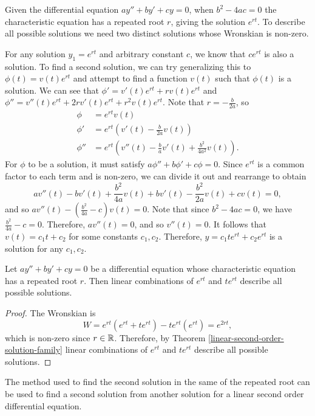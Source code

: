 Given the differential equation $ay'' + by' + cy = 0$, when $b^2 - 4ac = 0$ the characteristic equation has a repeated root $r$, giving the solution $e^{rt}$. To describe all possible solutions we need two distinct solutions whose Wronskian is non-zero.

For any solution $y_1 = e^{rt}$ and arbitrary constant $c$, we know that $ce^{rt}$ is also a solution. To find a second solution, we can try generalizing this to $\phi(t) = v(t)e^{rt}$ and attempt to find a function $v(t)$ such that $\phi(t)$ is a solution. We can see that $\phi' = v'(t)e^{rt} + rv(t)e^{rt}$ and $\phi'' = v''(t)e^{rt} + 2rv'(t)e^{rt} + r^2v(t)e^{rt}$. Note that $r = -\frac{b}{2a}$, so
\begin{align*}
    \phi &= e^{rt}v(t) \\
    \phi' &= e^{rt}(v'(t) - \frac{b}{2a}v(t)) \\
    \phi'' &= e^{rt}(v''(t) - \frac{b}{a}v'(t) + \frac{b^2}{4a^2}v(t)).
\end{align*}
For $\phi$ to be a solution, it must satisfy $a\phi'' + b\phi' + c\phi = 0$. Since $e^{rt}$ is a common factor to each term and is non-zero, we can divide it out and rearrange to obtain
\[av''(t) - bv'(t) + \frac{b^2}{4a}v(t) + bv'(t) - \frac{b^2}{2a}v(t) + cv(t) = 0,\] and so $av''(t) - \left(\frac{b^2}{4a} - c\right)v(t) = 0$. Note that since $b^2 - 4ac = 0$, we have $\frac{b^2}{4a} - c = 0$. Therefore, $av''(t) = 0$, and so $v''(t) = 0$. It follows that $v(t) = c_1t + c_2$ for some constants $c_1, c_2$. Therefore, $y = c_1te^{rt} + c_2e^{rt}$ is a solution for any $c_1, c_2$.

\begin{thm}\label{linear-second-order-repeated-roots}
    Let $ay'' + by' + cy = 0$ be a differential equation whose characteristic equation has a repeated root $r$. Then linear combinations of $e^{rt}$ and $te^{rt}$ describe all possible solutions.
\end{thm}

\begin{proof}
    The Wronskian is \[W = e^{rt}(e^{rt} + te^{rt}) - te^{rt}(e^{rt}) = e^{2rt},\] which is non-zero since $r \in \mathbb{R}$. Therefore, by Theorem \ref{linear-second-order-solution-family} linear combinations of $e^{rt}$ and $te^{rt}$ describe all possible solutions.
\end{proof}

\begin{rmk}
    The method used to find the second solution in the same of the repeated root can be used to find a second solution from another solution for a linear second order differential equation.
\end{rmk}


